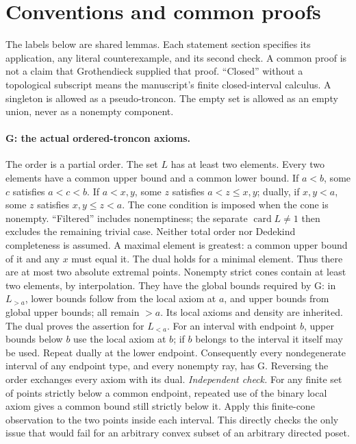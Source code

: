 \section*{Conventions and common proofs}
The labels below are shared lemmas. Each statement section specifies its application, any literal counterexample, and its second check. A common proof is not a claim that Grothendieck supplied that proof. ``Closed'' without a topological subscript means the manuscript's finite closed-interval calculus. A singleton is allowed as a pseudo-troncon. The empty set is allowed as an empty union, never as a nonempty component.

\paragraph{G: the actual ordered-troncon axioms.}\label{lem:G}
The order is a partial order. The set $L$ has at least two elements. Every two elements have a common upper bound and a common lower bound. If $a<b$, some $c$ satisfies $a<c<b$. If $a<x,y$, some $z$ satisfies $a<z\leq x,y$; dually, if $x,y<a$, some $z$ satisfies $x,y\leq z<a$. The cone condition is imposed when the cone is nonempty. ``Filtered'' includes nonemptiness; the separate $\operatorname{card}L\ne1$ then excludes the remaining trivial case. Neither total order nor Dedekind completeness is assumed.
A maximal element is greatest: a common upper bound of it and any $x$ must equal it. The dual holds for a minimal element. Thus there are at most two absolute extremal points. Nonempty strict cones contain at least two elements, by interpolation. They have the global bounds required by G: in $L_{>a}$, lower bounds follow from the local axiom at $a$, and upper bounds from global upper bounds; all remain $>a$. Its local axioms and density are inherited. The dual proves the assertion for $L_{<a}$. For an interval with endpoint $b$, upper bounds below $b$ use the local axiom at $b$; if $b$ belongs to the interval it itself may be used. Repeat dually at the lower endpoint. Consequently every nondegenerate interval of any endpoint type, and every nonempty ray, has G. Reversing the order exchanges every axiom with its dual.
\emph{Independent check.} For any finite set of points strictly below a common endpoint, repeated use of the binary local axiom gives a common bound still strictly below it. Apply this finite-cone observation to the two points inside each interval. This directly checks the only issue that would fail for an arbitrary convex subset of an arbitrary directed poset.

